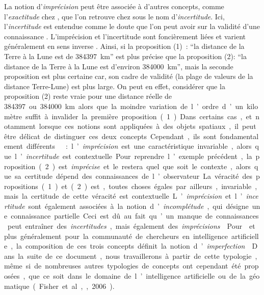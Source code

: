 La notion d’\emph{imprécision} peut être associée à d’autres concepts,
comme l’\emph{exactitude} chez \textcite{Russell1923}, que l’on
retrouve chez \textcite{Bouchon-Meunier1995,Bouchon-Meunier2007} sous
le nom d’\emph{incertitude}. Ici, l’\emph{incertitude} est entendue
comme le doute que l’on peut avoir sur la validité d’une connaissance
\autocite{Bouchon-Meunier1995}. L’imprécision et l’incertitude sont
foncièrement liées et varient généralement en sens inverse
\autocite{Russell1923}. Ainsi, si la proposition (1) : \enquote{la
  distance de la Terre à la Lune est de \SI{384397}{\km}} est plus
  précise que la proposition (2): \enquote{la distance de la Terre à
    la Lune est d’environ \SI{384000}{\km}}, mais la seconde
  proposition est plus certaine car, son cadre de validité (la plage
  de valeurs de la distance Terre-Lune) est plus large. On peut en
  effet, considérer que la proposition (2) reste vraie pour une
  distance réelle de \SI{384397} ou \SI{384000}{\km} alors que la
moindre variation de l’ordre d’un kilomètre suffit à invalider la
première proposition (1). Dans certains cas, et notamment lorsque ces
notions sont appliquées à des objets spatiaux, il peut être délicat de
distinguer ces deux concepts. Cependant, ils sont fondamentalement
différents : l’\emph{imprécision} est une caractéristique invariable,
alors que l’\emph{incertitude} est contextuelle. Pour reprendre
l’exemple précédent, la proposition (2) est \emph{imprécise} et le
restera quel que soit le contexte, alors que sa certitude dépend des
connaissances de l’observateur. La véracité des propositions (1) et
(2) est, toutes choses égales par ailleurs, invariable, mais la
certitude de cette véracité est contextuelle.

L’\emph{imprécision} et l’\emph{incertitude} sont également associées
à la notion d’\emph{incomplétude}, qui désigne une connaissance
partielle. Ceci est dû au fait qu’un manque de connaissances peut
entraîner des \emph{incertitudes}, mais également des
\emph{imprécisions}
\autocite{Bouchon-Meunier1995,Bouchon-Meunier2007}. Pour
 et plus généralement pour la communauté de
chercheurs en intelligence artificielle, la composition de ces trois
concepts définit la notion d’\emph{imperfection}
\autocite{Bouchon-Meunier1995} Dans la suite de ce document, nous
travaillerons à partir de cette typologie, même si de nombreuses
autres typologies de concepts ont cependant été proposées, que ce soit
dans le domaine de l’intelligence artificielle ou de la géomatique
(Fisher et al.,, 2006).


